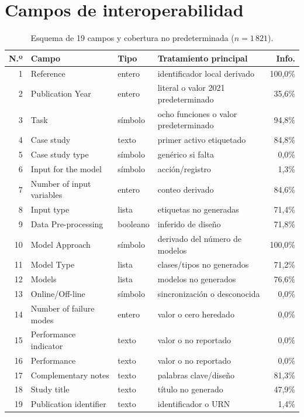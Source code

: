 \documentclass[11pt,a4paper]{article}
\begin{document}
\appendix
\section{Campos de interoperabilidad}
\label{app:fields}
\begin{table}[ht]
\centering
\caption{Esquema de 19 campos y cobertura no predeterminada ($n = 1\,821$).}
\footnotesize
\begin{tabularx}{\linewidth}{rllXr}
\toprule
N.º & Campo & Tipo & Tratamiento principal & Info. \\
\midrule
1 & Reference & entero & identificador local derivado & 100,0\% \\
2 & Publication Year & entero & literal o valor 2021 predeterminado & 35,6\% \\
3 & Task & símbolo & ocho funciones o valor predeterminado & 94,8\% \\
4 & Case study & texto & primer activo etiquetado & 84,8\% \\
5 & Case study type & símbolo & genérico si falta & 0,0\% \\
6 & Input for the model & símbolo & acción/registro & 1,3\% \\
7 & Number of input variables & entero & conteo derivado & 84,6\% \\
8 & Input type & lista & etiquetas no generadas & 71,4\% \\
9 & Data Pre-processing & booleano & inferido de diseño & 71,8\% \\
10 & Model Approach & símbolo & derivado del número de modelos & 100,0\% \\
11 & Model Type & lista & clases/tipos no generados & 71,2\% \\
12 & Models & lista & modelos no generados & 76,6\% \\
13 & Online/Off-line & símbolo & sincronización o desconocida & 0,0\% \\
14 & Number of failure modes & entero & valor o cero heredado & 0,0\% \\
15 & Performance indicator & texto & valor o no reportado & 0,0\% \\
16 & Performance & texto & valor o no reportado & 0,0\% \\
17 & Complementary notes & texto & palabras clave/diseño & 81,3\% \\
18 & Study title & texto & título no generado & 47,9\% \\
19 & Publication identifier & texto & identificador o URN & 1,4\% \\
\bottomrule
\end{tabularx}
\end{table}

\FloatBarrier


\end{document}

